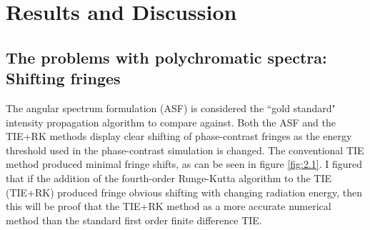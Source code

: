 \documentclass[10pt, a4paper, singlespacing]{report}
\begin{document}
\section{Results and Discussion}\label{Results}

\subsection{The problems with polychromatic spectra: Shifting fringes}\label{betterthan}
The angular spectrum formulation (ASF) is considered the ``gold standard" intensity propagation algorithm to compare against. Both the ASF and the TIE+RK methods display clear shifting of phase-contrast fringes as the energy threshold used in the phase-contrast simulation is changed. The conventional TIE method produced minimal fringe shifts, as can be seen in figure \ref{fig:2.1}. I figured that if the addition of the fourth-order Runge-Kutta algorithm to the TIE (TIE+RK) produced fringe obvious shifting with changing radiation energy, then this will be proof that the TIE+RK method as a more accurate numerical method than the standard first order finite difference TIE.
\end{document}
